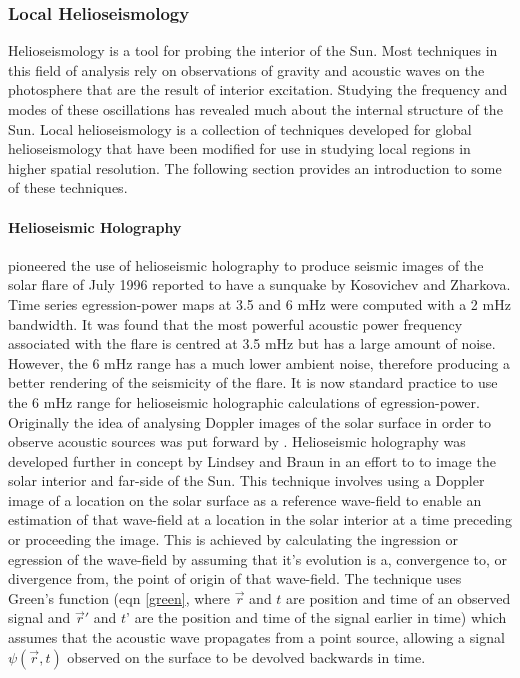 \subsubsection{Local Helioseismology}
Helioseismology is a tool for probing the interior of the Sun. Most techniques in this field of analysis rely on observations of gravity and acoustic waves on the photosphere that are the result of interior excitation. Studying the frequency and modes of these oscillations has revealed much about the internal structure of the Sun. Local helioseismology is a collection of techniques developed for global helioseismology that have been modified for use in studying local regions in higher spatial resolution. The following section provides an introduction to some of these techniques.


\paragraph{Helioseismic Holography}\label{helioholog}
\cite{1999ApJ...513L.143D} pioneered the use of helioseismic holography to produce seismic images of the solar flare of July 1996 reported to have a sunquake by Kosovichev and Zharkova. Time series egression-power maps at 3.5 and 6 mHz were computed with a 2 mHz bandwidth. It was found that the most powerful acoustic power frequency associated with the flare is centred at 3.5 mHz but has a large amount of noise. However, the 6 mHz range has a much lower ambient noise, therefore producing a better rendering of the seismicity of the flare. It is now standard practice to use the 6 mHz range for helioseismic holographic calculations of egression-power. \\
Originally the idea of analysing Doppler images of the solar surface in order to observe acoustic sources was put forward by \cite{1975CRASB.281...93R}. Helioseismic holography was developed further in concept by Lindsey and Braun \citep{1990SoPh..126..101L, 1992ApJ...392..739B, 1997ApJ...485..895L} in an effort to to image the solar interior and far-side of the Sun. This technique involves using a Doppler image of a location on the solar surface as a reference wave-field to enable an estimation of that wave-field at a location in the solar interior at a time preceding or proceeding the image. This is achieved by calculating the ingression or egression of the wave-field by assuming that it's evolution is a, convergence to, or divergence from, the point of origin of that wave-field. The technique uses Green's function (eqn \ref{green}, where $\vec{r}$ and $t$ are position and time of an observed signal and $\vec{r}'$ and $t$' are the position and time of the signal earlier in time) which assumes that the acoustic wave propagates from a point source, allowing a signal $\psi(\vec{r},t)$ observed on the surface to be devolved backwards in time.

